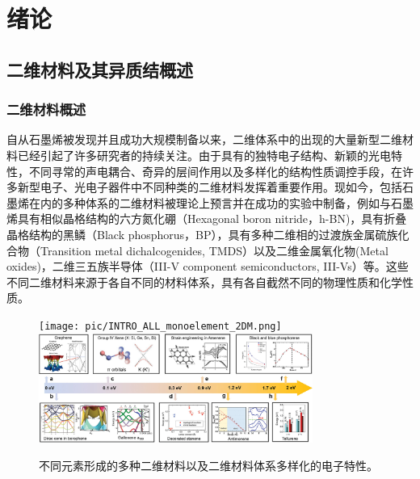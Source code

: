 \chapter{绪\hspace{6pt}论}

\section{二维材料及其异质结概述}
\subsection{二维材料概述}
    自从石墨烯被发现并且成功大规模制备以来，二维体系中的出现的大量新型二维材料已经引起了许多研究者的持续关注。由于具有的独特电子结构、新颖的光电特性，不同寻常的声电耦合、奇异的层间作用以及多样化的结构性质调控手段，在许多新型电子、光电子器件中不同种类的二维材料发挥着重要作用。现如今，包括石墨烯在内的多种体系的二维材料被理论上预言并在成功的实验中制备，例如与石墨烯具有相似晶格结构的六方氮化硼（Hexagonal boron nitride，h-BN)，具有折叠晶格结构的黑鳞（Black phosphorus，BP），具有多种二维相的过渡族金属硫族化合物（Transition metal dichalcogenides, TMDS）以及二维金属氧化物(Metal oxides)，二维三五族半导体（III-V component semiconductors, III-Vs）等。这些不同二维材料来源于各自不同的材料体系，具有各自截然不同的物理性质和化学性质。

    \begin{figure}[htb]
        \texttt{[image: pic/INTRO\_ALL\_monoelement\_2DM.png]}
        \includegraphics[width=0.8\textwidth]{pic/INTRO_electronProperties_All2DM.jpg}
        \caption{不同元素形成的多种二维材料以及二维材料体系多样化的电子特性。}
    \end{figure}


